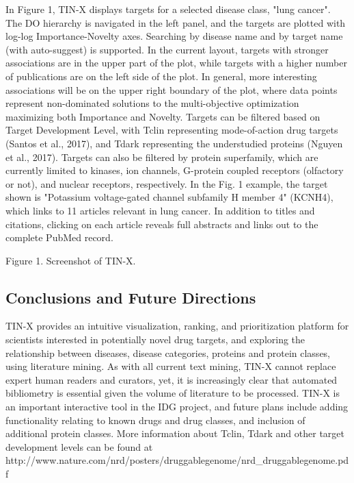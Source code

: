 In Figure 1, TIN-X displays targets for a selected disease class, "lung cancer".  The DO hierarchy is navigated in the left panel, and the targets are plotted with log-log Importance-Novelty axes. Searching by disease name and by target name (with auto-suggest) is supported. In the current layout, targets with stronger associations are in the upper part of the plot, while targets with a higher number of publications are on the left side of the plot. In general, more interesting associations will be on the upper right boundary of the plot, where data points represent non-dominated solutions to the multi-objective optimization maximizing both Importance and Novelty.  Targets can be filtered based on Target Development Level, with Tclin representing mode-of-action drug targets (Santos et al., 2017), and Tdark representing the understudied proteins (Nguyen et al., 2017). Targets can also be filtered by protein superfamily, which are currently limited to kinases, ion channels, G-protein coupled receptors (olfactory or not), and nuclear receptors, respectively. In the Fig. 1 example, the target shown is "Potassium voltage-gated channel subfamily H member 4" (KCNH4), which links to 11 articles relevant in lung cancer.  In addition to titles and citations, clicking on each article reveals full abstracts and links out to the complete PubMed record. 

Figure 1. Screenshot of TIN-X.

\subsection{Conclusions and Future Directions}

TIN-X provides an intuitive visualization, ranking, and prioritization platform for scientists interested in potentially novel drug targets, and exploring the relationship between diseases, disease categories, proteins and protein classes, using literature mining.  As with all current text mining, TIN-X cannot replace expert human readers and curators, yet, it is increasingly clear that automated bibliometry is essential given the volume of literature to be processed.  TIN-X is an important interactive tool in the IDG project, and future plans include adding functionality relating to known drugs and drug classes, and inclusion of additional protein classes. More information about Tclin, Tdark and other target development levels can be found at http://www.nature.com/nrd/posters/druggablegenome/nrd\_druggablegenome.pdf
